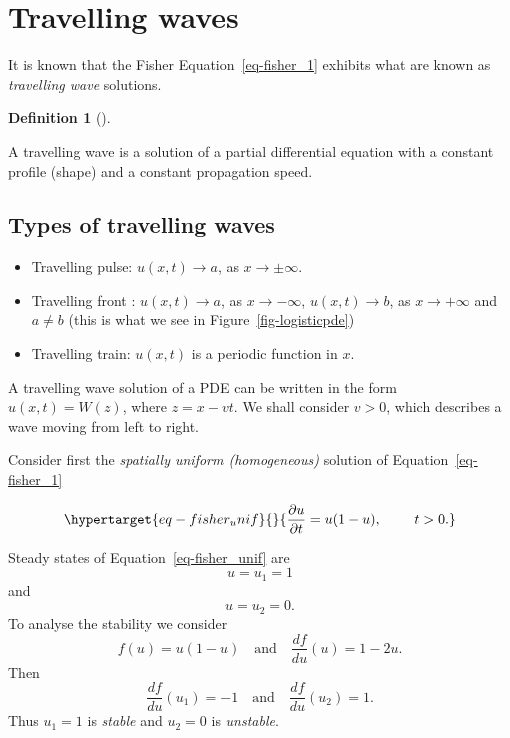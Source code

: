 \documentclass[
  letterpaper,
  DIV=11,
  numbers=noendperiod]{scrreprt}
\providecommand{\tightlist}{%
  \setlength{\itemsep}{0pt}\setlength{\parskip}{0pt}}\usepackage{longtable,booktabs,array}
\theoremstyle{plain}
\theoremstyle{definition}
\newtheorem{definition}{Definition}[chapter]
\theoremstyle{plain}
\theoremstyle{remark}
\begin{document}
\hypertarget{travelling-waves}{%
\section{Travelling waves}\label{travelling-waves}}

It is known that the Fisher Equation~\ref{eq-fisher_1} exhibits what are
known as \emph{travelling wave} solutions.

\begin{definition}[]\protect\hypertarget{def-trwave}{}\label{def-trwave}

A travelling wave is a solution of a partial differential equation with
a constant profile (shape) and a constant propagation speed.

\end{definition}

\hypertarget{types-of-travelling-waves}{%
\subsection{Types of travelling waves}\label{types-of-travelling-waves}}

\begin{itemize}
\tightlist
\item
  Travelling pulse: \(u(x,t) \to a\), as \(x \to \pm \infty\).
\item
  Travelling front : \(u(x,t) \to a\), as \(x \to - \infty\),
  \(u(x,t) \to b\), as \(x \to + \infty\) and \(a\neq b\) (this is what
  we see in Figure~\ref{fig-logisticpde})
\item
  Travelling train: \(u(x,t)\) is a periodic function in \(x\).
\end{itemize}

A travelling wave solution of a PDE can be written in the form
\(u(x,t) = W(z)\), where \(z = x - vt\). We shall consider \(v>0\),
which describes a wave moving from left to right.

Consider first the \emph{spatially uniform (homogeneous)} solution of
Equation~\ref{eq-fisher_1}

\begin{equation}\protect\hypertarget{eq-fisher_unif}{}{ 
\frac{\partial u}{\partial t} =    u(1-u), \qquad   \, \, t >0.
}\label{eq-fisher_unif}\end{equation}

Steady states of Equation~\ref{eq-fisher_unif} are \[
u=u_1 =1
\] and \[
u=u_2 =0.
\] To analyse the stability we consider \[
f(u)=u(1-u) \quad \textrm{and} \quad \frac{ df}{du}(u)= 1 - 2u.
\] Then \[
\frac{ df}{du}(u_1)= -1 \quad \textrm{and} \quad \frac{ df}{du}(u_2)= 1.
\] Thus \(u_1=1\) is \emph{stable} and \(u_2=0\) is \emph{unstable}.
\end{document}
